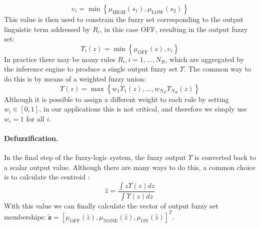 \begin{equation}
\upsilon_{i} = \min\left\{\mu_{\textrm{HIGH}}(s_{1}),\mu_{\textrm{LOW}}(s_{2})\right\}
\end{equation}
This value is then used to constrain the fuzzy set corresponding to the output linguistic term addressed by $R_{i}$, in this case OFF, resulting in the output fuzzy set:
\begin{equation}
\Upsilon_{\!i}(z) = \min\left\{\mu_{\textrm{OFF}}(z),\upsilon_{i}\right\}
\end{equation}
In practice there may be many rules $R_{i}, i=1,\dots,N_{R}$, which are aggregated by the inference engine to produce a single output fuzzy set $\Upsilon$. The common way to do this \cite{mendel1995fuzzy} is by means of a weighted fuzzy union:
\begin{equation}
\Upsilon(z) = \max\left\{w_{1}\Upsilon_{\!1}(z),\dots,w_{N_{R}}\Upsilon_{\!N_{R}}(z)\right\}
\end{equation}
Although it is possible to assign a different weight to each rule by setting $w_{i}\in[0,1]$, in our applications this is not critical, and therefore we simply use $w_{i}=1$ for all $i$.

\paragraph{Defuzzification.} In the final step of the fuzzy-logic system, the fuzzy output $\Upsilon$ is converted back to a scalar output value. Although there are many ways to do this, a common choice is to calculate the centroid \cite{mendel1995fuzzy}:
\begin{equation}
\label{eq:centroid-general}
\hat{z} = \frac{\int z\Upsilon(z)dz}{\int\Upsilon(z)dz} 
\end{equation}
With this value we can finally calculate the vector of output fuzzy set memberships: $\tilde{\mathbf{z}}=[\mu_{\textrm{OFF}}(\hat{z}),\mu_{\textrm{NONE}}(\hat{z}),\mu_{\textrm{ON}}(\hat{z})]^{T}$.

